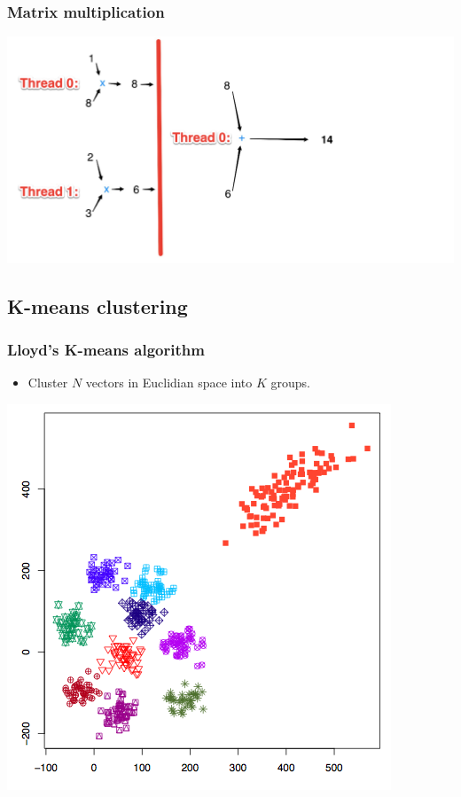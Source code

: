\documentclass[handout]{beamer}
\numberwithin{equation}{section}
\begin{document}
\begin{frame}
\frametitle{Matrix multiplication}
\includegraphics[scale=0.2]{../../fig/matb3}
\end{frame}



\subsection{K-means clustering}

\begin{frame}
\frametitle{Lloyd's K-means algorithm}
\begin{itemize}
\item Cluster $N$ vectors in Euclidian space into $K$ groups. 
\end{itemize}

\begin{center}
\includegraphics[scale=.4]{../../fig/kmeans0.png}
\end{center}
\end{frame}
\end{document}

